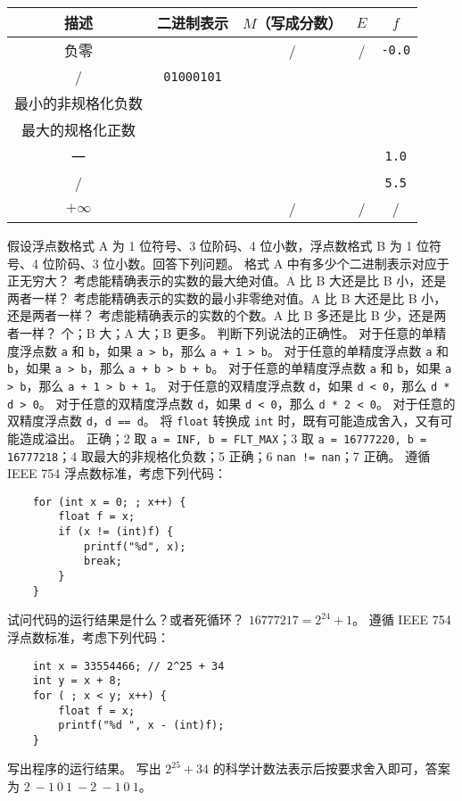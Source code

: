 \begin{problems}
\begin{table}[H]
\begin{tabular}{|c|c|c|c|c|}
				\hline
				描述 & 二进制表示 & $M$（写成分数） & $E$ & $f$ \\ \hline
				负零 &  & / & / & \texttt{-0.0} \\ \hline
				/ & \verb|01000101| &  &  &  \\ \hline
				最小的非规格化负数 &  &  &  &  \\ \hline
				最大的规格化正数 &  &  &  &  \\ \hline
				一 &  &  &  & \texttt{1.0} \\ \hline
				/ &  &  &  & \texttt{5.5} \\ \hline
				$+\infty$ &  & / & / & / \\ \hline
			\end{tabular}
		\end{table}
		\pro 假设浮点数格式 A 为 1 位符号、3 位阶码、4 位小数，浮点数格式 B 为 1 位符号、4 位阶码、3 位小数。回答下列问题。
			\qn 格式 A 中有多少个二进制表示对应于正无穷大？
			\qn 考虑能精确表示的实数的最大绝对值。A 比 B 大还是比 B 小，还是两者一样？
			\qn 考虑能精确表示的实数的最小非零绝对值。A 比 B 大还是比 B 小，还是两者一样？
			\qn 考虑能精确表示的实数的个数。A 比 B 多还是比 B 少，还是两者一样？
		 个；B 大；A 大；B 更多。
		\pro 判断下列说法的正确性。
			\qn 对于任意的单精度浮点数 \texttt{a} 和 \texttt{b}，如果 \texttt{a > b}，那么 \texttt{a + 1 > b}。
			\qn 对于任意的单精度浮点数 \texttt{a} 和 \texttt{b}，如果 \texttt{a > b}，那么 \texttt{a + b > b + b}。
			\qn 对于任意的单精度浮点数 \texttt{a} 和 \texttt{b}，如果 \texttt{a > b}，那么 \texttt{a + 1 > b + 1}。
			\qn 对于任意的双精度浮点数 \texttt{d}，如果 \texttt{d < 0}，那么 \texttt{d * d > 0}。
			\qn 对于任意的双精度浮点数 \texttt{d}，如果 \texttt{d < 0}，那么 \texttt{d * 2 < 0}。
			\qn 对于任意的双精度浮点数 \texttt{d}，\texttt{d == d}。
			\qn 将 \texttt{float} 转换成 \texttt{int} 时，既有可能造成舍入，又有可能造成溢出。
		 正确；2 取 \verb|a = INF, b = FLT_MAX|；3 取 \verb|a = 16777220, b = 16777218|；4 取最大的非规格化负数；5 正确；6 \verb|nan != nan|；7 正确。
		\pro 遵循 IEEE 754 浮点数标准，考虑下列代码：
		\begin{verbatim}
    for (int x = 0; ; x++) {
        float f = x;
        if (x != (int)f) {
            printf("%d", x);
            break;
        }
    }
		\end{verbatim}
		试问代码的运行结果是什么？或者死循环？
		\sol $16777217=2^{24}+1$。
		\pro 遵循 IEEE 754 浮点数标准，考虑下列代码：
		\begin{verbatim}
    int x = 33554466; // 2^25 + 34
    int y = x + 8;
    for ( ; x < y; x++) {
        float f = x;
        printf("%d ", x - (int)f);
    }
		\end{verbatim}
		写出程序的运行结果。
		\sol 写出 $2^{25}+34$ 的科学计数法表示后按要求舍入即可，答案为 $2\ -1\ 0\ 1\ -2\ -1\ 0\ 1$。
	\end{problems}

